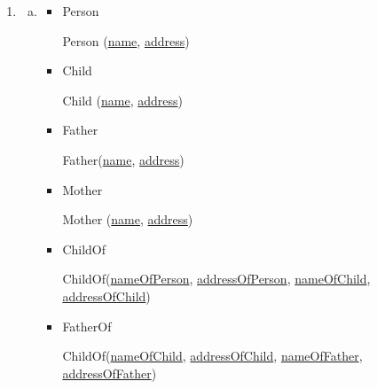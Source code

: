 \documentclass[12pt]{article}
\begin{document}
\begin{enumerate}[1.]
\begin{enumerate}[a)]
\begin{itemize}
            \bigskip
        \end{itemize}

    \end{enumerate}

    \item

    \begin{enumerate}[a)]
        \item

        \begin{itemize}
            \item Person

            \bigskip

            \quad Person (\underline{name}, \underline{address})

            \bigskip

            \item Child

            \bigskip

            \quad Child (\underline{name}, \underline{address})

            \bigskip

            \item Father

            \bigskip

            \quad Father(\underline{name}, \underline{address})

            \bigskip

            \item Mother

            \bigskip

            \quad Mother (\underline{name}, \underline{address})

            \bigskip

            \item ChildOf

            \bigskip

            \quad ChildOf(\underline{nameOfPerson}, \underline{addressOfPerson},
                    \underline{nameOfChild}, \underline{addressOfChild})

            \bigskip

            \item FatherOf

            \bigskip

            \quad ChildOf(\underline{nameOfChild}, \underline{addressOfChild},
                    \underline{nameOfFather}, \underline{addressOfFather})


\end{itemize}
\end{enumerate}
\end{enumerate}
\end{document}
